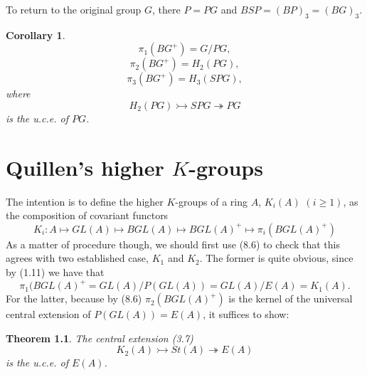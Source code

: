\documentclass[openany,leqno]{book}  %
\newtheorem{theorem}{Theorem}[chapter]
\newtheorem{corollary}[theorem]{Corollary}
\begin{document}
To return to the original group $G$, there $P = PG$ and $BSP = (BP)_3 = (BG)_3$.
\begin{corollary}
 \[  \pi_1(BG^+)= G/PG ,\]
\[ \pi_2(BG^+)=H_2(PG),\] 
\[ \pi_3(BG^+)=H_3(SPG),\]
where
\[ H_2(PG) \rightarrowtail  SPG\twoheadrightarrow PG\]
is the {\em u.c.e.} of $PG$.
\end{corollary}


\chapter{Quillen's higher $K$-groups} %
\label{cha:9quillen_s_higher_k_groups}

The intention is to define the higher $K$-groups of a ring $A$, $K_i(A)$ $(i\geqslant 1)$, as the composition of covariant functors
\[K_i\colon   A\mapsto GL(A) \mapsto BGL(A) \mapsto BGL(A)^+\mapsto \pi_i(BGL(A)^+)\]
As a matter of procedure though, we should first use (8.6) to check that this agrees with two established case, $K_1$ and $K_2$. The former is quite obvious, since by (1.11) we have that
\[\pi_1(BGL(A)^+=GL(A)/P(GL(A))=GL(A)/E(A)=K_1(A).\]
For the latter, because by (8.6) $\pi_2(BGL(A)^+)$ is the kernel of the universal central extension of $P(GL(A))=E(A)$, it suffices to show:
\begin{theorem}
The central extension (3.7)
\[K_2(A)\rightarrowtail St(A)\twoheadrightarrow E(A)\]
is the u.c.e. of $E(A)$.
\end{theorem}
\end{document}
